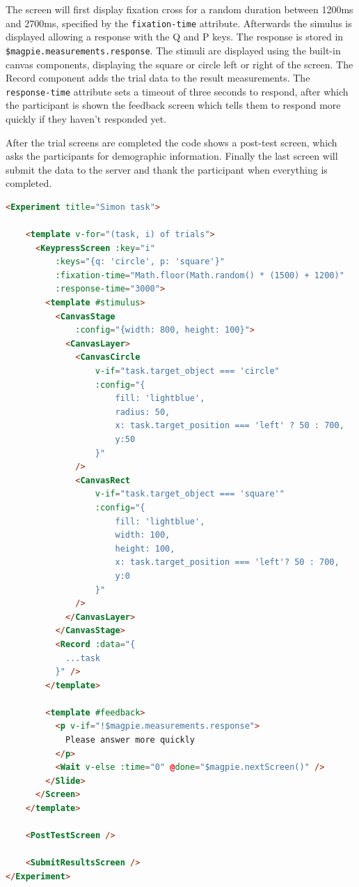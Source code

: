 \documentclass[a4paper,11pt]{scrreprt}
\begin{document}
The screen will first display fixation cross for a random duration between 1200ms and 2700ms, specified by the \texttt{fixation-time} attribute. Afterwards the simulus is displayed allowing a response with the Q and P keys. The response is stored in \texttt{\$magpie.measurements.response}. The stimuli are displayed using the built-in canvas components, displaying the square or circle left or right of the screen. The Record component adds the trial data to the result measurements. The \texttt{response-time} attribute sets a timeout of three seconds to respond, after which the participant is shown the feedback screen which tells them to respond more quickly if they haven't responded yet.

After the trial screens are completed the code shows a post-test screen, which asks the participants for demographic information. Finally the last screen will submit the data to the server and thank the participant when everything is completed.

\begin{lstlisting}[language=html]
<Experiment title="Simon task">

    <template v-for="(task, i) of trials">
      <KeypressScreen :key="i"
          :keys="{q: 'circle', p: 'square'}"
          :fixation-time="Math.floor(Math.random() * (1500) + 1200)"
          :response-time="3000">
        <template #stimulus>
          <CanvasStage
              :config="{width: 800, height: 100}">
            <CanvasLayer>
              <CanvasCircle
                  v-if="task.target_object === 'circle"
                  :config="{
                      fill: 'lightblue',
                      radius: 50,
                      x: task.target_position === 'left' ? 50 : 700,
                      y:50
                  }"
              />
              <CanvasRect
                  v-if="task.target_object === 'square'"
                  :config="{
                      fill: 'lightblue',
                      width: 100,
                      height: 100,
                      x: task.target_position === 'left'? 50 : 700,
                      y:0
                  }"
              />
            </CanvasLayer>
          </CanvasStage>
          <Record :data="{
            ...task
          }" />
        </template>

        <template #feedback>
          <p v-if="!$magpie.measurements.response">
          	Please answer more quickly
          </p>
          <Wait v-else :time="0" @done="$magpie.nextScreen()" />
        </Slide>
      </Screen>
    </template>

    <PostTestScreen />

    <SubmitResultsScreen />
</Experiment>
\end{lstlisting}
\end{document}

